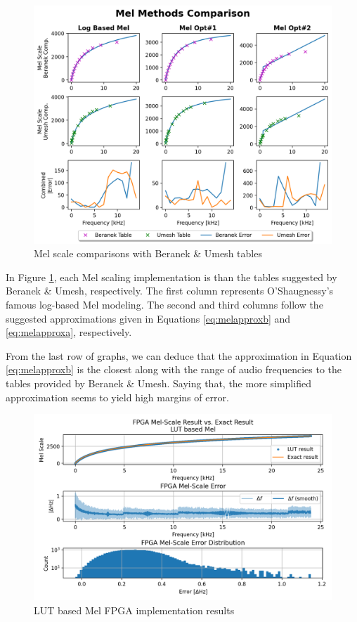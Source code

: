 \begin{figure}[H]
    \centering
    \includegraphics[width=\linewidth]{Scaling/images/mel_methods_comp}
    \caption{Mel scale comparisons with Beranek \& Umesh tables}\label{fig:mel_methods_comp}
\end{figure}

In Figure \ref{fig:mel_methods_comp}, each Mel scaling implementation is than 
the tables suggested by Beranek \& Umesh, respectively. The first column represents
O'Shaugnessy's famous log-based Mel modeling.
The second and third columns follow the suggested approximations
given in Equations \ref{eq:melapproxb} and \ref{eq:melapproxa}, respectively.


From the last row of graphs, we can deduce that the approximation
in Equation \ref{eq:melapproxb} is the closest along with the range of audio frequencies
to the tables provided by Beranek \& Umesh. Saying that, the more simplified 
approximation seems to yield high margins of error.

\begin{figure}[H]
    \centering
    \includegraphics[width=\linewidth]{Scaling/images/mel_lut}
    \caption{LUT based Mel FPGA implementation results}\label{fig:mel_lut}
\end{figure}

